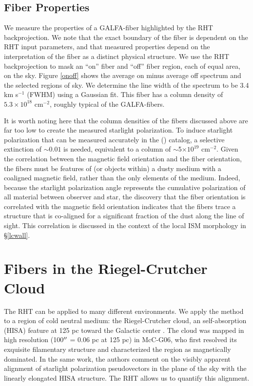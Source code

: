 \subsection{Fiber Properties}\label{fiberprop}

We measure the properties of a GALFA-\hi fiber highlighted by the RHT backprojection. We note that the exact boundary of the fiber is dependent on the RHT input parameters, and that measured properties depend on the interpretation of the fiber as a distinct physical structure. 
We use the RHT backprojection to mask an ``on'' fiber and ``off'' fiber region, each of equal area, on the sky. Figure \ref{onoff} shows the average on minus average off spectrum and the selected regions of sky. We determine the line width of the spectrum to be 3.4 km s$^{-1}$ (FWHM) using a Gaussian fit. This fiber has a column density of $5.3 \times 10^{18}$ cm$^{-2}$, roughly typical of the GALFA-\hi fibers.

It is worth noting here that the column densities of the fibers discussed above are far too low to create the measured starlight polarization. To induce starlight polarization that can be measured accurately in the \citeauthor{Heiles:2000un} (\citeyear{Heiles:2000un}) catalog, a selective extinction of $\sim0.01$ is needed, equivalent to a column of $\sim$5$ \times 10^{19}$ cm$^{-2}$. Given the correlation between the magnetic field orientation and the fiber orientation, the fibers must be features of (or objects within) a dusty medium with a coaligned magnetic field, rather than the only elements of the medium. Indeed, because the starlight polarization angle represents the cumulative polarization of all material between observer and star, the discovery that the fiber orientation is correlated with the magnetic field orientation indicates that the fibers trace a structure that is co-aligned for a significant fraction of the dust along the line of sight. This correlation is discussed in the context of the local ISM morphology in \S \ref{lcwall}.

\section{Fibers in the Riegel-Crutcher Cloud}\label{rccloud}

The RHT can be applied to many different environments. We apply the method to a region of cold neutral medium: the Riegel-Crutcher cloud, an \hi self-absorption (HISA) feature at 125 pc toward the Galactic center \citep{Heeschen:1955wi,Riegel:1972wk}. The cloud was mapped in high resolution (100${\mbox{$^{\prime\prime}$}}$ = 0.06 pc at 125 pc) in McC-G06, who first resolved its exquisite filamentary structure and characterized the region as magnetically dominated. In the same work, the authors comment on the visibly apparent alignment of starlight polarization pseudovectors in the plane of the sky with the linearly elongated HISA structure. The RHT allows us to quantify this alignment.

